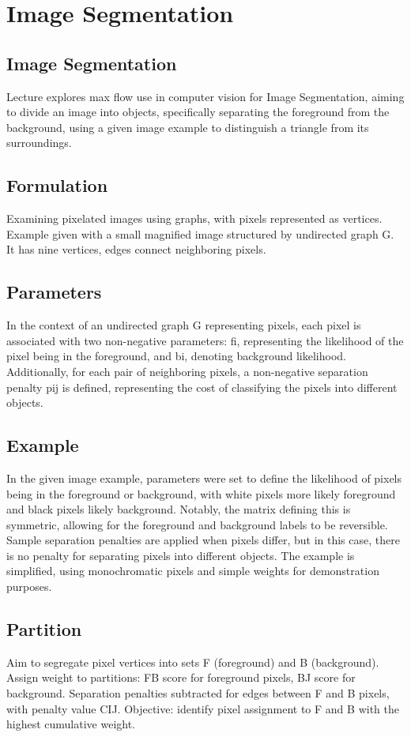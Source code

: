 \section*{Image Segmentation}

\subsection*{Image Segmentation}
Lecture explores max flow use in computer vision for Image Segmentation, aiming to divide an image into objects, specifically separating the foreground from the background, using a given image example to distinguish a triangle from its surroundings.

\subsection*{Formulation}
Examining pixelated images using graphs, with pixels represented as vertices.
Example given with a small magnified image structured by undirected graph G\@.
It has nine vertices, edges connect neighboring pixels.

\subsection*{Parameters}
In the context of an undirected graph G representing pixels, each pixel is associated with two non-negative parameters: fi, representing the likelihood of the pixel being in the foreground, and bi, denoting background likelihood.
Additionally, for each pair of neighboring pixels, a non-negative separation penalty pij is defined, representing the cost of classifying the pixels into different objects.

\subsection*{Example}
In the given image example, parameters were set to define the likelihood of pixels being in the foreground or background, with white pixels more likely foreground and black pixels likely background.
Notably, the matrix defining this is symmetric, allowing for the foreground and background labels to be reversible.
Sample separation penalties are applied when pixels differ, but in this case, there is no penalty for separating pixels into different objects.
The example is simplified, using monochromatic pixels and simple weights for demonstration purposes.

\subsection*{Partition}
Aim to segregate pixel vertices into sets F (foreground) and B (background).
Assign weight to partitions: FB score for foreground pixels, BJ score for background.
Separation penalties subtracted for edges between F and B pixels, with penalty value CIJ\@.
Objective: identify pixel assignment to F and B with the highest cumulative weight.

